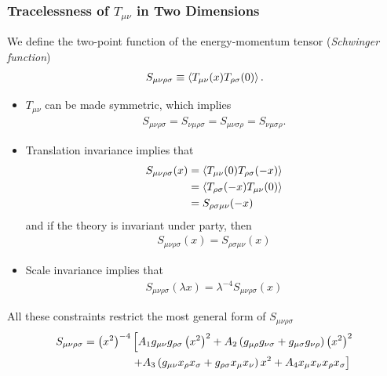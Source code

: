 \documentclass[10pt]{article}
\begin{document}
\subsubsection{Tracelessness of \texorpdfstring{$T_{\mu\nu}$}{T mu nu} in Two Dimensions}
We define the two-point function of the energy-momentum tensor (\textit{Schwinger function})
\begin{align}
    S_{\mu\nu\rho\sigma}\equiv\expval{T_{\mu\nu}(x)T_{\rho\sigma}(0)}.
\end{align}
\begin{itemize}
    \item $T_{\mu\nu}$ can be made symmetric, which implies
          \begin{align}
              S_{\mu\nu\rho\sigma}=S_{\nu\mu\rho\sigma}=S_{\mu\nu\sigma\rho}=S_{\nu\mu\sigma\rho}.
          \end{align}
    \item Translation invariance implies that
          \begin{align}
              S_{\mu\nu\rho\sigma}(x) & =\expval{T_{\mu\nu}(0)T_{\rho\sigma}(-x)}\notag \\
                                      & =\expval{T_{\rho\sigma}(-x)T_{\mu\nu}(0)}\notag \\
                                      & =S_{\rho\sigma\mu\nu}(-x)
          \end{align}
          and if the theory is invariant under party, then
          \begin{align}
              S_{\mu\nu\rho\sigma}(x)=S_{\rho\sigma\mu\nu}(x)
          \end{align}
    \item Scale invariance implies that
          \begin{align}
              S_{\mu\nu\rho\sigma}(\lambda x)=\lambda^{-4}S_{\mu\nu\rho\sigma}(x)
          \end{align}
\end{itemize}
All these constraints restrict the most general form of $S_{\mu\nu\rho\sigma}$
\begin{align}
    S_{\mu\nu\rho\sigma}=\left(x^2\right)^{-4} & \left[A_{1}g_{\mu\nu}g_{\rho\sigma}\left(x^2\right)^2+A_2\left(g_{\mu\rho}g_{\nu\sigma}+g_{\mu\sigma}g_{\nu\rho}\right)\left(x^2\right)^2\right.\notag      \\
                                               & \left.+A_3\left(g_{\mu\nu}x_\rho x_\sigma+g_{\rho\sigma}x_\mu x_\nu\right)x^2+A_{4}x_\mu x_\nu x_\rho x_\sigma\right]\label{eq:ward_identities:Schwinger_1}
\end{align}
\end{document}
